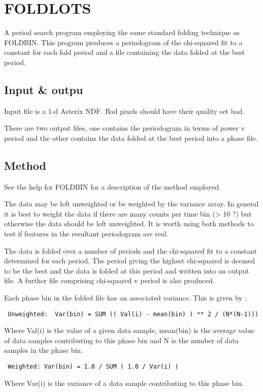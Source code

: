 \documentclass{book}
\renewcommand{\_}{{\tt\char'137}}     %
\begin{document}
\section{FOLDLOTS}
A period search program employing the same standard folding technique
as FOLDBIN. This program produces a periodogram of the chi-squared
fit to a constant for each fold period and a file containing the
data folded at the best period.

\subsection{Input \& outpu}
Input file is a 1-d Asterix NDF. Bad pixels should have their quality
set bad.

There are two output files, one contains the periodogram in terms
of power v period and the other contains the data folded at the
best period into a phase file.

\subsection{Method}
See the help for FOLDBIN for a description of the method employed.

The data may be left unweighted or be weighted by the variance array.
In general it is best to weight the data if there are many counts per
time bin (> 10 ?) but otherwise the data should be left unweighted.
It is worth using both methods to test if features in the resultant
periodogram are real.

The data is folded over a number of periods and the chi-squared
fit to a constant determined for each period. The period giving
the highest chi-squared is deemed to be the best and the
data is folded at this period and written into an output file.
A further file comprising chi-squared v period is also produced.

Each phase bin in the folded file has an associated variance.
This is given by :
\begin{verbatim}
 Unweighted:  Var(bin) = SUM (( Val(i) - mean(bin) ) ** 2 / (N*(N-1)))
\end{verbatim}
Where Val(i) is the value of a given data sample, mean(bin) is the
average value of data samples contributing to this phase bin and
N is the number of data samples in the phase bin.

\begin{verbatim}
 Weighted: Var(bin) = 1.0 / SUM ( 1.0 / Var(i) )
\end{verbatim}
Where Var(i) is the variance of a data sample contributing to this
phase bin.
\end{document}
